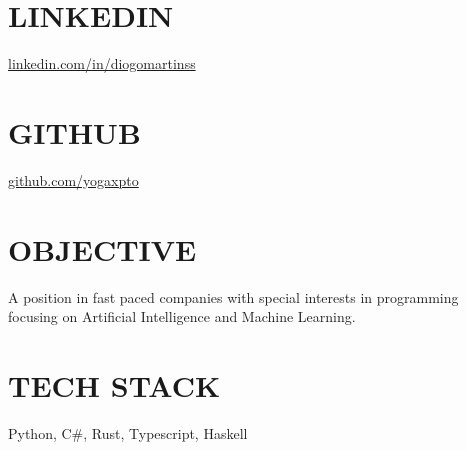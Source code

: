 \documentclass[margin, 10pt]{res} %
\begin{document}
\begin{resume}


    \section{LINKEDIN}

    \href{https://www.linkedin.com/in/diogomartinss}{linkedin.com/in/diogomartinss}


    \section{GITHUB}

    \href{https://github.com/yogaxpto}{github.com/yogaxpto}


    \section{OBJECTIVE}

    A position in fast paced companies with special interests in programming focusing on Artificial Intelligence and Machine Learning.



    \section{TECH STACK}

    Python, C\#, Rust, Typescript, Haskell



\end{resume}
\end{document}
